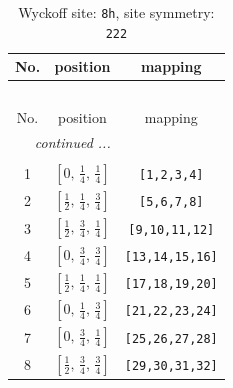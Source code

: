 \documentclass[fleqn,8pt]{jsarticle}
\begin{document}
\begin{longtable}{ccc}
\caption{Wyckoff site: {\tt 8h}, site symmetry: {\tt 222}}
 \\
 \hline \hline
No. & position & mapping \\ \hline \endfirsthead

\multicolumn{2}{l}{\tablename\ \thetable{}} \\
 \hline \hline
No. & position & mapping \\ \hline \endhead

 \hline \hline
\multicolumn{2}{r}{\footnotesize\it continued ...} \\ \endfoot

 \hline \hline
\multicolumn{2}{r}{} \\ \endlastfoot

1 & $\left[ 0,\, \frac{1}{4},\, \frac{1}{4} \right]$ & {\tt [1,2,3,4]} \\ \hline
2 & $\left[ \frac{1}{2},\, \frac{1}{4},\, \frac{3}{4} \right]$ & {\tt [5,6,7,8]} \\ \hline
3 & $\left[ \frac{1}{2},\, \frac{3}{4},\, \frac{1}{4} \right]$ & {\tt [9,10,11,12]} \\ \hline
4 & $\left[ 0,\, \frac{3}{4},\, \frac{3}{4} \right]$ & {\tt [13,14,15,16]} \\ \hline
5 & $\left[ \frac{1}{2},\, \frac{1}{4},\, \frac{1}{4} \right]$ & {\tt [17,18,19,20]} \\ \hline
6 & $\left[ 0,\, \frac{1}{4},\, \frac{3}{4} \right]$ & {\tt [21,22,23,24]} \\ \hline
7 & $\left[ 0,\, \frac{3}{4},\, \frac{1}{4} \right]$ & {\tt [25,26,27,28]} \\ \hline
8 & $\left[ \frac{1}{2},\, \frac{3}{4},\, \frac{3}{4} \right]$ & {\tt [29,30,31,32]} \\
\end{longtable}
\renewcommand{\arraystretch}{1.2}
\end{document}
